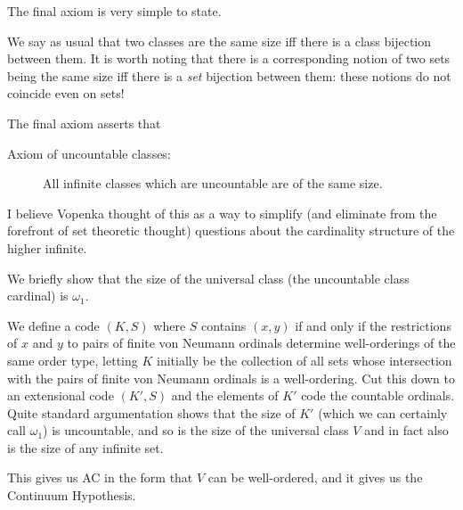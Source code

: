 \documentclass{slides}
\begin{document}
\begin{slide}

The final axiom is very simple to state.

We say as usual that two classes are the same size iff there is a class bijection between them.  It is worth noting that there is a corresponding notion of two sets being the same size iff there is a {\em set\/} bijection between them:  these notions do not coincide even on sets!

The final axiom asserts that 

\begin{description}

\item[Axiom of uncountable classes:]  All infinite classes which are uncountable are of the same size.

\end{description}  I believe Vopenka thought of this as a way to simplify (and eliminate from the forefront of set theoretic thought) questions about the cardinality structure of the higher infinite.

\end{slide}

\begin{slide}

We briefly show that the size of the universal class (the uncountable class cardinal) is $\omega_1$.

We define a code $(K,S)$ where $S$ contains $(x,y)$ if and only if the restrictions of $x$ and $y$ to pairs of finite von Neumann ordinals determine well-orderings of the same order type, letting $K$ initially be the collection of all sets whose intersection with the pairs of finite von Neumann ordinals is a well-ordering.  Cut this down to an extensional code $(K',S)$ and the elements of $K'$ code the countable ordinals.  Quite standard argumentation shows that the size of $K'$ (which we can certainly call $\omega_1$) is uncountable, and so is the size of the universal class $V$ and in fact also is the size of any infinite set.

This gives us AC in the form that $V$ can be well-ordered, and it gives us the Continuum Hypothesis.

\end{slide}
\end{document}
